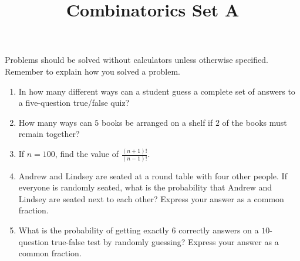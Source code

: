 \documentclass{article}
\title{Combinatorics Set A}
\author{}
\date{}
\begin{document}
\maketitle
\noindent Problems should be solved without calculators unless otherwise 
specified. Remember to explain how you solved a problem.
\begin{enumerate}
    \item In how many different ways can a student guess a complete set of 
        answers to a five-question true/false quiz?
        \vspace{3cm}
    \item How many ways can $5$ books be arranged on a shelf if $2$ of the books 
        must remain together?
        \vspace{3cm}
    \item If $n = 100$, find the value of $\frac{(n+1)!}{(n-1)!}$.
        \vspace{3cm}
    \item Andrew and Lindsey are seated at a round table with four other people.  
        If everyone is randomly seated, what is the probability that Andrew and 
        Lindsey are seated next to each other? Express your answer as a common 
        fraction.
        \vspace{3cm}
    \item What is the probability of getting exactly $6$ correctly answers on a  
        $10$-question true-false test by randomly guessing? Express your answer 
        as a common fraction.
        \vspace{3cm}
\end{enumerate}
\end{document}
